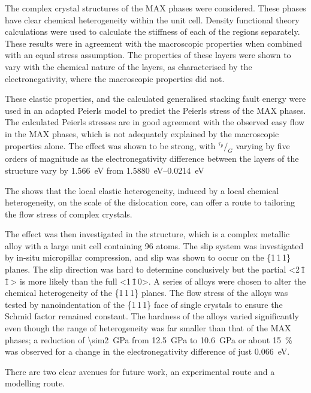 The complex crystal structures of the MAX phases were considered. These phases have clear chemical heterogeneity within the unit cell. Density functional theory calculations were used to calculate the stiffness of each of the regions separately. These results were in agreement with the macroscopic properties when combined with an equal stress assumption. The properties of these layers were shown to vary with the chemical nature of the layers, as characterised by the electronegativity, where the macroscopic properties did not.

These elastic properties, and the calculated generalised stacking fault energy were used in an adapted Peierls model to predict the Peierls stress of the MAX phases. The calculated Peierls stresses are in good agreement with the observed easy flow in the MAX phases, which is not adequately explained by the macroscopic properties alone. The effect was shown to be strong, with $^{\tau_p}\!/_{G}$ varying by five orders of magnitude as the electronegativity difference between the layers of the structure vary by \SI{1.566}{\electronvolt} from \SIrange{1.5880}{0.0214}{\electronvolt}

The shows that the local elastic heterogeneity, induced by a local chemical heterogeneity, on the scale of the dislocation core, can offer a route to tailoring the flow stress of complex crystals.

The effect was then investigated in the  structure, which is a complex metallic alloy with a large unit cell containing 96 atoms. The slip system was investigated by in-situ micropillar compression, and slip was shown to occur on the \{1\,1\,1\} planes. The slip direction was hard to determine conclusively but the partial <2\,\={1}\,\={1}\,> is more likely than the full <1\,\={1}\,0>. A series of alloys were chosen to alter the chemical heterogeneity of the  \{1\,1\,1\} planes. The flow stress of the alloys was tested by nanoindentation of the \{1\,1\,1\} face of single crystals to ensure the Schmid factor remained constant. The hardness of the alloys varied significantly even though the range of heterogeneity was far smaller than that of the MAX phases; a reduction of \SI{\sim2}{\giga\pascal} from \SI{12.5}{\giga\pascal} to \SI{10.6}{\giga\pascal} or about \SI{15}{\percent} was observed for a change in the electronegativity difference of just \SI{0.066}{\electronvolt}.



There are two clear avenues for future work, an experimental route and a modelling route.

